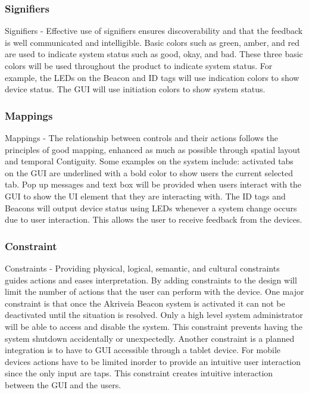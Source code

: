\subsubsection{Signifiers}
Signifiers - Effective use of signifiers ensures discoverability and that the feedback is well communicated and intelligible. Basic colors such as green, amber, and red are used to indicate system status such as good, okay, and bad. These three basic colors will be used throughout the product to indicate system status. For example, the LEDs on the Beacon and ID tags will use indication colors to show device status. The GUI will use initiation colors to show system status.
\medskip

\subsubsection{Mappings}
Mappings - The relationship between controls and their actions follows the principles of good mapping, enhanced as much as possible through spatial layout and temporal Contiguity. Some examples on the system include: activated tabs on the GUI are underlined with a bold color to show users the current selected tab. Pop up messages and text box will be provided when users interact with the GUI to show the UI element that they are interacting with. The ID tags and Beacons will output device status using LEDs whenever a system change occurs due to user interaction. This allows the user to receive feedback from the devices.
\medskip

\subsubsection{Constraint}
Constraints - Providing physical, logical, semantic, and cultural constraints guides actions and eases interpretation. By adding constraints to the design will limit the number of actions that the user can perform with the device. One major constraint is that once the Akriveia Beacon system is activated it can not be deactivated until the situation is resolved. Only a high level system administrator will be able to access and disable the system. This constraint prevents having the system shutdown accidentally or unexpectedly. Another constraint is a planned integration is to have to GUI accessible through a tablet device. For mobile devices actions have to be limited inorder to provide an intuitive user interaction since the only input are taps. This constraint creates intuitive interaction between the GUI and the users.
